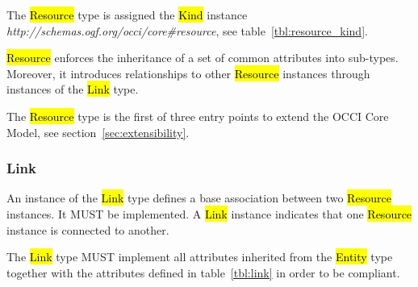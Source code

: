 \documentclass[10pt,a4paper]{article}
\begin{document}
The \hl{Resource} type is assigned the \hl{Kind} instance
\textit{http://schemas.ogf.org/occi/core\#resource}, see
table~\ref{tbl:resource_kind}.


\hl{Resource} enforces the inheritance of a set of common attributes
into sub-types. Moreover, it introduces relationships to other
\hl{Resource} instances through instances of the \hl{Link} type.

The \hl{Resource} type is the first of three entry points to extend
the OCCI Core Model, see section~\ref{sec:extensibility}.

\subsubsection{Link}
\label{sec:link}
An instance of the \hl{Link} type defines a base association between
two \hl{Resource} instances. It MUST be implemented. A \hl{Link}
instance indicates that one \hl{Resource} instance is connected to
another.

The \hl{Link} type MUST implement all attributes inherited from the
\hl{Entity} type together with the attributes defined in
table~\ref{tbl:link} in order to be compliant.

\end{document}
